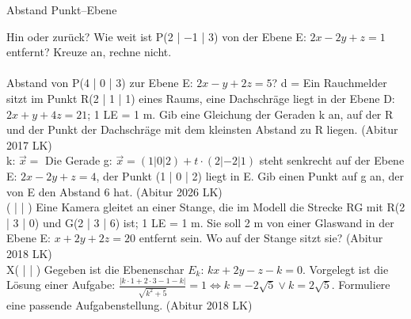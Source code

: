 \setcounter{aufgabe}{11}

\begin{aufgabe}{Abstand Punkt–Ebene}
\begin{teile}
\teil Hin oder zurück? Wie weit ist P(2 | −1 | 3) von der Ebene E: $2x - 2y + z = 1$ entfernt? Kreuze an, rechne nicht. \\  \\ 
\teil Abstand von P(4 | 0 | 3) zur Ebene E: $2x - y + 2z = 5$? d = \leerfeld
\teil Ein Rauchmelder sitzt im Punkt R(2 | 1 | 1) eines Raums, eine Dachschräge liegt in der Ebene D: $2x + y + 4z = 21$; 1 LE = 1 m. Gib eine Gleichung der Geraden k an, auf der R und der Punkt der Dachschräge mit dem kleinsten Abstand zu R liegen. \hfill (Abitur 2017 LK) \\ k: $\vec x = $ \leerfeld
\teil Die Gerade g: $\vec x = (1 | 0 | 2) + t \cdot (2 | -2 | 1)$ steht senkrecht auf der Ebene E: $2x - 2y + z = 4$, der Punkt (1 | 0 | 2) liegt in E. Gib einen Punkt auf g an, der von E den Abstand 6 hat. \hfill (Abitur 2026 LK) \\ ( \leerfeld | \leerfeld | \leerfeld )
\teil Eine Kamera gleitet an einer Stange, die im Modell die Strecke RG mit R(2 | 3 | 0) und G(2 | 3 | 6) ist; 1 LE = 1 m. Sie soll 2 m von einer Glaswand in der Ebene E: $x + 2y + 2z = 20$ entfernt sein. Wo auf der Stange sitzt sie? \hfill (Abitur 2018 LK) \\ X( \leerfeld | \leerfeld | \leerfeld )
\teil Gegeben ist die Ebenenschar $E_k$: $kx + 2y - z - k = 0$. Vorgelegt ist die Lösung einer Aufgabe: $\frac{|k \cdot 1 + 2 \cdot 3 - 1 - k|}{\sqrt{k^2 + 5}} = 1 \Leftrightarrow k = -2\sqrt{5} \vee k = 2\sqrt{5}$. Formuliere eine passende Aufgabenstellung. \hfill (Abitur 2018 LK)
\end{teile}
\end{aufgabe}

